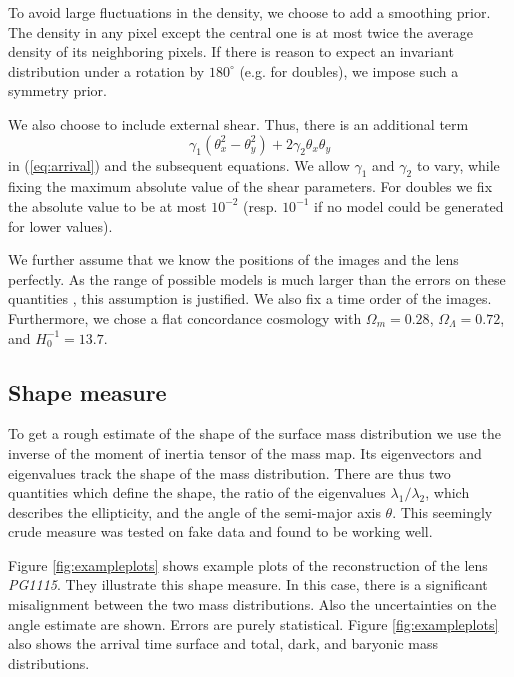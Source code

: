\documentclass[useAMS,usenatbib]{mn2e}
\begin{document}
To avoid large fluctuations in the density, we choose to add a smoothing prior. The density in any pixel except the central one is at most twice the average density of its neighboring pixels. If there is reason to expect an invariant distribution under a rotation by $180^{\circ}$ (e.g. for doubles), we impose such a symmetry prior.

We also choose to include external shear. Thus, there is an additional term
\begin{equation}
  \gamma_{1}\left(\theta_{x}^{2}-\theta_{y}^{2}\right)+2\gamma_{2}\theta_{x}\theta_{y}
\end{equation}
in (\ref{eq:arrival}) and the subsequent equations. We allow $\gamma_{1}$ and $\gamma_{2}$ to vary, while fixing the maximum absolute value of the shear parameters. For doubles we fix the absolute value to be at most $10^{-2}$ (resp. $10^{-1}$ if no model could be generated for lower values).

We further assume that we know the positions of the images and the lens perfectly. As the range of possible models is much larger than the errors on these quantities \citep{2006ApJ...650L..17S}, this assumption is justified. We also fix a time order of the images. Furthermore, we chose a flat concordance cosmology with $\Omega_{m}=0.28$, $\Omega_{\Lambda}=0.72$, and $H_{0}^{-1}=13.7$.

\subsection{Shape measure}

To get a rough estimate of the shape of the surface mass distribution we use the inverse of the moment of inertia tensor of the mass map. Its eigenvectors and eigenvalues track the shape of the mass distribution. There are thus two quantities which define the shape, the ratio of the eigenvalues $\lambda_{1}/\lambda_{2}$, which describes the ellipticity, and the angle of the semi-major axis $\theta$. This seemingly crude measure was tested on fake data and found to be working well.

Figure \ref{fig:exampleplots} shows example plots of the reconstruction of the lens \textit{PG1115}. They illustrate this shape measure. In this case, there is a significant misalignment between the two mass distributions. Also the uncertainties on the angle estimate are shown. Errors are purely statistical. Figure \ref{fig:exampleplots} also shows the arrival time surface and total, dark, and baryonic mass distributions.
\end{document}
